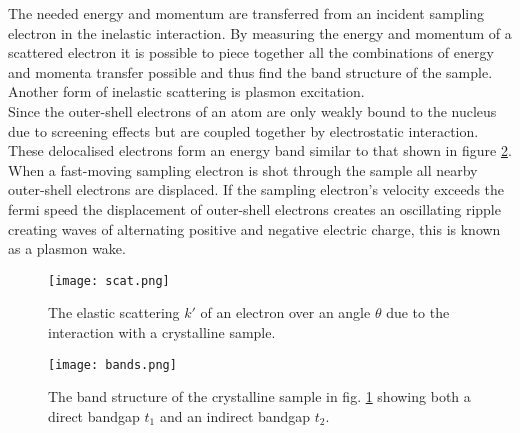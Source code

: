 The needed energy and momentum are transferred from an incident sampling electron in the inelastic interaction. By measuring the energy and momentum of a scattered electron it is possible to piece together all the combinations of energy and momenta transfer possible and thus find the band structure of the sample.\\
Another form of inelastic scattering is plasmon excitation.\\
Since the outer-shell electrons of an atom are only weakly bound to the nucleus due to screening effects but are coupled together by electrostatic interaction. These delocalised electrons form an energy band similar to that shown in figure \ref{fig:bands}.
When a fast-moving sampling electron is shot through the sample all nearby outer-shell electrons are displaced. If the sampling electron's velocity exceeds the fermi speed the displacement of outer-shell electrons creates an oscillating ripple creating waves of alternating positive and negative electric charge, this is known as a plasmon wake.



\begin{figure}
	\centering
	\texttt{[image: scat.png]}
	\caption{The elastic scattering $k'$ of an electron over an angle $\theta$ due to the interaction with a crystalline sample.}
	\label{fig:scat}
\end{figure}

\begin{figure}
	\centering
	\texttt{[image: bands.png]}
	\caption{The band structure of the crystalline sample in fig. \ref{fig:scat} showing both a direct bandgap $t_1$ and an indirect bandgap $t_2$.}
	\label{fig:bands}
\end{figure}



